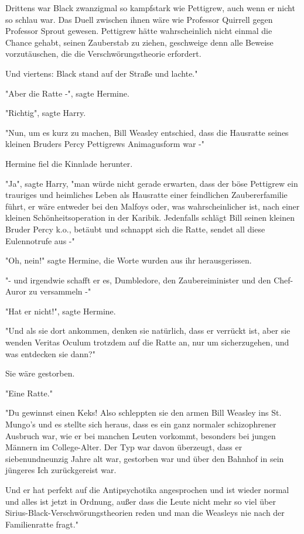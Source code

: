 {Drittens war Black zwanzigmal so kampfstark wie Pettigrew, auch wenn er nicht so schlau war. Das Duell zwischen ihnen wäre wie Professor Quirrell gegen Professor Sprout gewesen. Pettigrew hätte wahrscheinlich nicht einmal die Chance gehabt, seinen Zauberstab zu ziehen, geschweige denn alle Beweise vorzutäuschen, die die Verschwörungstheorie erfordert.

Und viertens: Black stand auf der Straße und lachte."

"Aber die Ratte -", sagte Hermine.

"Richtig", sagte Harry.

"Nun, um es kurz zu machen, Bill Weasley entschied, dass die Hausratte seines kleinen Bruders Percy Pettigrews Animagusform war -"

Hermine fiel die Kinnlade herunter.

"Ja", sagte Harry, "man würde nicht gerade erwarten, dass der böse Pettigrew ein trauriges und heimliches Leben als Hausratte einer feindlichen Zaubererfamilie führt, er wäre entweder bei den Malfoys oder, was wahrscheinlicher ist, nach einer kleinen Schönheitsoperation in der Karibik. Jedenfalls schlägt Bill seinen kleinen Bruder Percy k.o., betäubt und schnappt sich die Ratte, sendet all diese Eulennotrufe aus -"

"Oh, nein!" sagte Hermine, die Worte wurden aus ihr herausgerissen.

"- und irgendwie schafft er es, Dumbledore, den Zaubereiminister und den Chef-Auror zu versammeln -"

"Hat er nicht!", sagte Hermine.

"Und als sie dort ankommen, denken sie natürlich, dass er verrückt ist, aber sie wenden Veritas Oculum trotzdem auf die Ratte an, nur um sicherzugehen, und was entdecken sie dann?"

Sie wäre gestorben.

"Eine Ratte."

"Du gewinnst einen Keks! Also schleppten sie den armen Bill Weasley ins St. Mungo's und es stellte sich heraus, dass es ein ganz normaler schizophrener Ausbruch war, wie er bei manchen Leuten vorkommt, besonders bei jungen Männern im College-Alter. Der Typ war davon überzeugt, dass er siebenundneunzig Jahre alt war, gestorben war und über den Bahnhof in sein jüngeres Ich zurückgereist war.

Und er hat perfekt auf die Antipsychotika angesprochen und ist wieder normal und alles ist jetzt in Ordnung, außer dass die Leute nicht mehr so viel über Sirius-Black-Verschwörungstheorien reden und man die Weasleys nie nach der Familienratte fragt."

}
